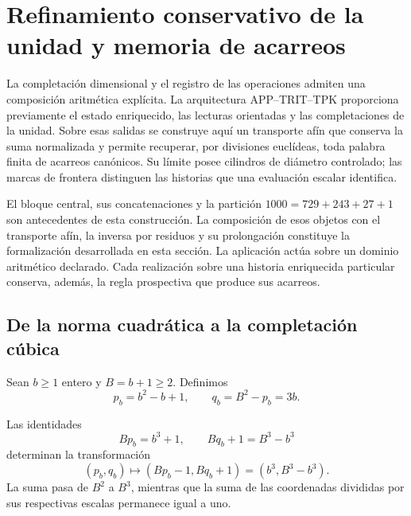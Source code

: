\section{Refinamiento conservativo de la unidad y memoria de acarreos}
\label{lib03:refinamiento}

La completación dimensional y el registro de las operaciones admiten una
composición aritmética explícita. La arquitectura APP--TRIT--TPK proporciona
previamente el estado enriquecido, las lecturas orientadas y las
completaciones de la unidad. Sobre esas salidas se construye aquí un
transporte afín que conserva la suma normalizada y permite recuperar, por
divisiones euclídeas, toda palabra finita de acarreos canónicos. Su límite
posee cilindros de diámetro controlado; las marcas de frontera distinguen
las historias que una evaluación escalar identifica.

El bloque central, sus concatenaciones y la partición
\(1000=729+243+27+1\) son antecedentes de esta construcción. La composición
de esos objetos con el transporte afín, la inversa por residuos y su
prolongación constituye la formalización desarrollada en esta sección.
La aplicación actúa sobre un dominio aritmético declarado. Cada realización
sobre una historia enriquecida particular conserva, además, la regla
prospectiva que produce sus acarreos.

\subsection{De la norma cuadrática a la completación cúbica}
\label{lib03:completacion}

Sean \(b\geq1\) entero y \(B=b+1\geq2\). Definimos
\begin{equation}
 p_b=b^2-b+1,\qquad q_b=B^2-p_b=3b.
 \label{lib03:pb}
\end{equation}

\begin{proposition}
\label{lib03:prop-completacion}
Las identidades
\begin{equation}
 Bp_b=b^3+1,\qquad Bq_b+1=B^3-b^3
 \label{lib03:cuadratica-cubica}
\end{equation}
determinan la transformación
\begin{equation}
 (p_b,q_b)\longmapsto(Bp_b-1,Bq_b+1)
       =(b^3,B^3-b^3).
 \label{lib03:transferencia-cubica}
\end{equation}
La suma pasa de \(B^2\) a \(B^3\), mientras que la suma de las
coordenadas divididas por sus respectivas escalas permanece igual a uno.
\end{proposition}

